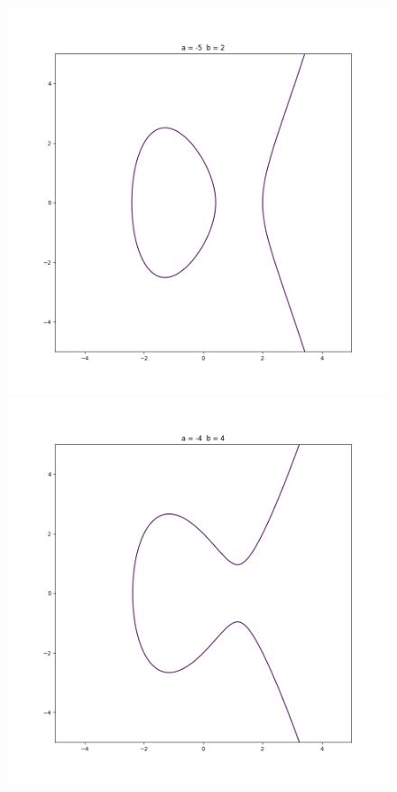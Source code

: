 \documentclass[a4paper,12pt]{report}
\begin{document}
\begin{figure}[h!]
	\includegraphics[scale=0.30]{Figure_3}
	\includegraphics[scale=0.30]{Figure_4}
\end{figure}
\cleardoublepage
\end{document}
